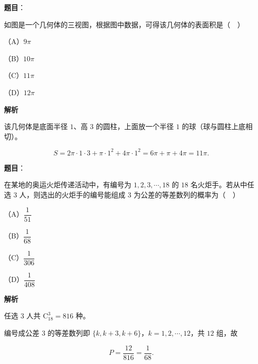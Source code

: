 \begin{answer}

\textbf{题目}：

如图是一个几何体的三视图，根据图中数据，可得该几何体的表面积是（　）
\nopagebreak[4]
\begin{center}\end{center}
\nopagebreak[4]
（A）$9\pi$

（B）$10\pi$

（C）$11\pi$

（D）$12\pi$

\textbf{解析}

该几何体是底面半径 $1$、高 $3$ 的圆柱，上面放一个半径 $1$ 的球（球与圆柱上底相切）。

\nopagebreak[4]
\[S=2\pi\cdot1\cdot3+\pi\cdot1^2+4\pi\cdot1^2=6\pi+\pi+4\pi=11\pi.\]


\end{answer}
\begin{answer}

\textbf{题目}：

在某地的奥运火炬传递活动中，有编号为 $1,2,3,\cdots,18$ 的 $18$ 名火炬手。若从中任选 $3$ 人，则选出的火炬手的编号能组成 $3$ 为公差的等差数列的概率为（　）

（A）$\dfrac1{51}$

（B）$\dfrac1{68}$

（C）$\dfrac1{306}$

（D）$\dfrac1{408}$

\textbf{解析}

任选 $3$ 人共 $\mathrm C_{18}^3=816$ 种。

编号成公差 $3$ 的等差数列即 $\{k,k+3,k+6\}$，$k=1,2,\cdots,12$，共 $12$ 组，故

\nopagebreak[4]
\[P=\frac{12}{816}=\frac1{68}.\]


\end{answer}
